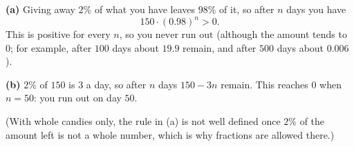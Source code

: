 \textbf{(a)} Giving away $2\%$ of what you have leaves $98\%$ of it, so after $n$ days you have
\[
150\cdot(0.98)^n>0 .
\]
This is positive for every $n$, so you $\boxed{\text{never run out}}$ (although the amount tends to $0$; for example, after $100$ days about $19.9$ remain, and after $500$ days about $0.006$).

\textbf{(b)} $2\%$ of $150$ is $3$ a day, so after $n$ days $150-3n$ remain. This reaches $0$ when $n=50$: you run out on day $\boxed{50}$.

(With whole candies only, the rule in (a) is not well defined once $2\%$ of the amount left is not a whole number, which is why fractions are allowed there.)
